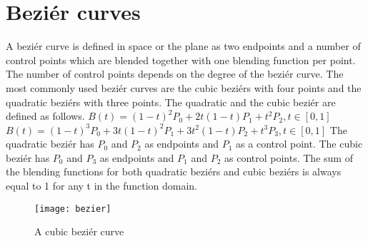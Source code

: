 \section{Beziér curves}\label{bezier}
A beziér curve is defined in space or the plane as two endpoints and a number of control points which are blended together with one blending function per point. The number of control points depends on the degree of the beziér curve. The most commonly used beziér curves are the cubic beziérs with four points and the quadratic beziérs with three points. The quadratic and the cubic beziér are defined as follows.\vspace{\baselineskip}\newline
\begin{math}
B(t) = (1-t)^2P_0+2t(1-t)P_1+t^2P_2, t\in[0, 1] 
\end{math} \vspace{\baselineskip}\newline
\begin{math}
B(t) = (1 - t)^3P_0 + 3t(1 - t)^2P_1 + 3t^2(1 - t)P_2 + t^3P_3, t\in[0, 1]
\end{math} \vspace{\baselineskip}\newline
The quadratic beziér has $P_0$ and $P_2$ as endpoints and $P_1$ as a control point. The cubic beziér has $P_0$ and $P_3$ as endpoints and $P_1$ and $P_2$ as control points. The sum of the blending functions for both quadratic beziérs and cubic beziérs is always equal to 1 for any t in the function domain.\citep{PFNP}

\begin{figure}[H]
\texttt{[image: bezier]}
\caption{A cubic beziér curve}
\end{figure}

